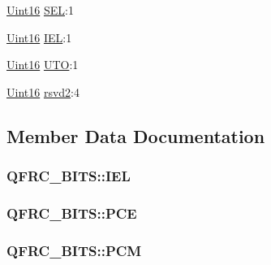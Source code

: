 \begin{DoxyCompactItemize}
\item 
\hyperlink{_d_s_p2833x___device_8h_a59a9f6be4562c327cbfb4f7e8e18f08b}{Uint16} \hyperlink{struct_q_f_r_c___b_i_t_s_a636968e699596011e991def743195843}{S\+E\+L}\+:1
\item 
\hyperlink{_d_s_p2833x___device_8h_a59a9f6be4562c327cbfb4f7e8e18f08b}{Uint16} \hyperlink{struct_q_f_r_c___b_i_t_s_a3f146c847284e8212e5903cb37de3bc3}{I\+E\+L}\+:1
\item 
\hyperlink{_d_s_p2833x___device_8h_a59a9f6be4562c327cbfb4f7e8e18f08b}{Uint16} \hyperlink{struct_q_f_r_c___b_i_t_s_af4e1fa8397256b95cb031bf4d4010ea9}{U\+T\+O}\+:1
\item 
\hyperlink{_d_s_p2833x___device_8h_a59a9f6be4562c327cbfb4f7e8e18f08b}{Uint16} \hyperlink{struct_q_f_r_c___b_i_t_s_a184f247f6da0b5442e7924c9c2d1e8f1}{rsvd2}\+:4
\end{DoxyCompactItemize}


\subsection{Member Data Documentation}
\hypertarget{struct_q_f_r_c___b_i_t_s_a3f146c847284e8212e5903cb37de3bc3}{}
\subsubsection[{I\+E\+L}]{ Q\+F\+R\+C\+\_\+\+B\+I\+T\+S\+::\+I\+E\+L}\label{struct_q_f_r_c___b_i_t_s_a3f146c847284e8212e5903cb37de3bc3}
\hypertarget{struct_q_f_r_c___b_i_t_s_ab18b19ae9cc0cc3d5f839bd1199980de}{}
\subsubsection[{P\+C\+E}]{ Q\+F\+R\+C\+\_\+\+B\+I\+T\+S\+::\+P\+C\+E}\label{struct_q_f_r_c___b_i_t_s_ab18b19ae9cc0cc3d5f839bd1199980de}
\hypertarget{struct_q_f_r_c___b_i_t_s_a1d0151ae93671fd6f8d4d36de9a19662}{}
\subsubsection[{P\+C\+M}]{ Q\+F\+R\+C\+\_\+\+B\+I\+T\+S\+::\+P\+C\+M}\label{struct_q_f_r_c___b_i_t_s_a1d0151ae93671fd6f8d4d36de9a19662}
\hypertarget{struct_q_f_r_c___b_i_t_s_ae5816dfcac21f90a07fc3bfd183d3330}{}
